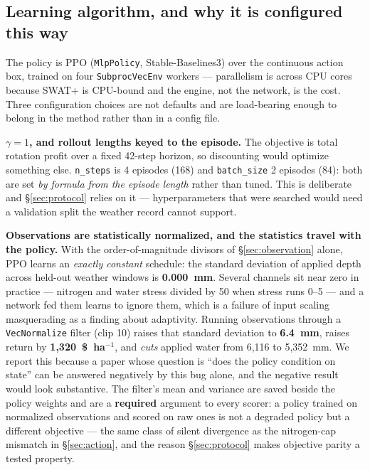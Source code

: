 \documentclass[a4paper,fleqn]{cas-sc}
\begin{document}
\subsection{Learning algorithm, and why it is configured this way}\label{sec:ppo}

The policy is PPO (\texttt{MlpPolicy}, Stable-Baselines3) over the continuous action
box, trained on four \texttt{SubprocVecEnv} workers --- parallelism is across CPU cores
because SWAT+ is CPU-bound and the engine, not the network, is the cost. Three
configuration choices are not defaults and are load-bearing enough to belong in the
method rather than in a config file.

\textbf{$\gamma = 1$, and rollout lengths keyed to the episode.} The objective is total
rotation profit over a fixed 42-step horizon, so discounting would optimize something
else. \texttt{n\_steps} is 4 episodes (168) and \texttt{batch\_size} 2 episodes (84):
both are set \emph{by formula from the episode length} rather than tuned. This is
deliberate and \S\ref{sec:protocol} relies on it --- hyperparameters that were searched
would need a validation split the weather record cannot support.

\textbf{Observations are statistically normalized, and the statistics travel with the
policy.} With the order-of-magnitude divisors of \S\ref{sec:observation} alone, PPO
learns an \emph{exactly constant} schedule: the standard deviation of applied depth
across held-out weather windows is \textbf{0.000~mm}. Several channels sit near zero in
practice --- nitrogen and water stress divided by 50 when stress runs 0--5 --- and a
network fed them learns to ignore them, which is a failure of input scaling masquerading
as a finding about adaptivity. Running observations through a \texttt{VecNormalize}
filter (clip 10) raises that standard deviation to \textbf{6.4~mm}, raises return by
\textbf{1{,}320~\$~ha$^{-1}$}, and \emph{cuts} applied water from 6{,}116 to 5{,}352~mm.
We report this because a paper whose question is ``does the policy condition on state''
can be answered negatively by this bug alone, and the negative result would look
substantive. The filter's mean and variance are saved beside the policy weights and are
a \textbf{required} argument to every scorer: a policy trained on normalized
observations and scored on raw ones is not a degraded policy but a different objective
--- the same class of silent divergence as the nitrogen-cap mismatch in
\S\ref{sec:action}, and the reason \S\ref{sec:protocol} makes objective parity a tested
property.
\end{document}
